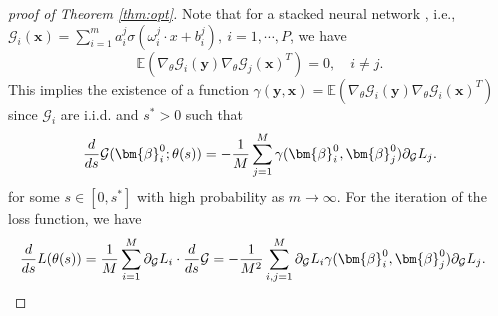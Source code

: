 \documentclass[preprint,12pt]{elsarticle}
\theoremstyle{plain}
\numberwithin{figure}{section}
\numberwithin{table}{section}
\begin{document}
\begin{proof}[proof of Theorem \ref{thm:opt}]
	Note that for a stacked neural network , i.e., $\mathcal{G}_i(\bm{x})=\sum_{i=1}^m a_i^j\sigma(\omega_i^j\cdot x+b_i^j),~i=1,\cdots,P$, we have
	$$\mathbb{E}(\nabla_\theta\mathcal{G}_i(\bm{y})\nabla_\theta\mathcal{G}_j(\bm{x})^T)=0, \quad i\neq j. $$
	This implies the existence of a function $\gamma(\bm{y},\bm{x})=\mathbb{E}(\nabla_\theta\mathcal{G}_i(\bm{y})\nabla_\theta\mathcal{G}_i(\bm{x})^T)$ since $\mathcal{G}_i$ are i.i.d. and $s^*>0$ such that
	\begin{equation}
		\frac{d}{ds}\mathcal{G}(\bm{\beta}_i^0;\theta(s)) = -{1\over M}\sum_{j=1}^M  \gamma(\bm{\beta}_i^0,\bm{\beta}_j^0)\partial_{\mathcal{G}}{L}_j.
	\end{equation}
	for some $s\in [0,s^*]$ with high probability \cite{yang2025homotopy} as $m\rightarrow\infty$. For the iteration of the loss function, we have
	\begin{equation}
		\begin{aligned}
			{d\over ds}L(\theta(s)) &= {1\over M}\sum_{i=1}^M\partial_{\mathcal{G}}L_i\cdot \frac{d}{ds}\mathcal{G}=-{1\over M^2}\sum_{i,j=1}^M \partial_{\mathcal{G}}L_i\gamma(\bm{\beta}_i^0,\bm{\beta}_j^0)\partial_{\mathcal{G}}{L}_j.
		\end{aligned}
	\end{equation}
	

\end{proof}
\end{document}
